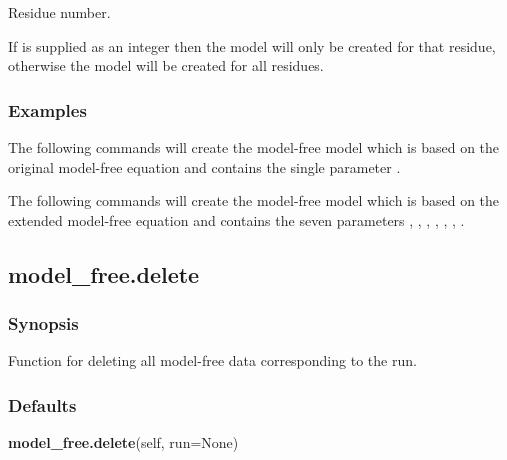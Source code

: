 Residue number.

If 
 is supplied as an integer then the model will only be created for that residue,
otherwise the model will be created for all residues.


\subsubsection{Examples}

The following commands will create the model-free model 
 which is based on the original
model-free equation and contains the single parameter 
.





The following commands will create the model-free model 
 which is based on the
extended model-free equation and contains the seven parameters 
, 
, 
, 
,
, 
, 
.





\newpage

\subsection{model\_free.delete}


\subsubsection{Synopsis}

Function for deleting all model-free data corresponding to the run.

\subsubsection{Defaults}

\textsf{\textbf{model\_free.delete}(self, run=None)}


